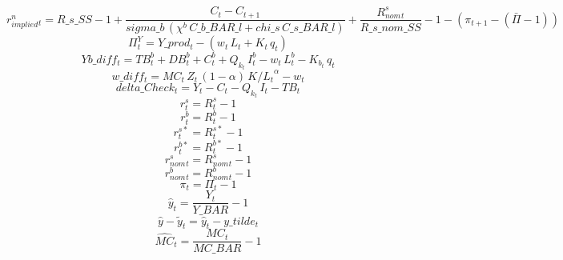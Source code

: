 \begin{dmath}
{r^n_{implied}_{t}}={R\_s\_SS}-1+\frac{{C_{t}}-{C_{t+1}}}{{sigma\_b}\, \left({\chi^b }\, {C\_b\_BAR\_l}+{chi\_s}\, {C\_s\_BAR\_l}\right)}+\frac{{ R^s_{nom}_{t}}}{{R\_s\_nom\_SS}}-1-\left({ \pi _{t+1}}-\left({ \bar{\Pi} }-1\right)\right)
\end{dmath}
\begin{dmath}
{\Pi^Y_{t}}={Y\_prod_{t}}-\left({w_{t}}\, {L_{t}}+{K_{t}}\, {q_{t}}\right)
\end{dmath}
\begin{dmath}
{Yb\_diff_{t}}={TB^b_{t}}+{DB^b_{t}}+{C^b_{t}}+{ Q_k _{t}}\, {I^b_{t}}-{w_{t}}\, {L^b_{t}}-{K_b_{t}}\, {q_{t}}
\end{dmath}
\begin{dmath}
{w\_diff_{t}}={MC_{t}}\, {Z_{t}}\, \left(1-{\alpha }\right)\, {K/L_{t}}^{{\alpha }}-{w_{t}}
\end{dmath}
\begin{dmath}
{delta\_Check_{t}}={Y_{t}}-{C_{t}}-{ Q_k _{t}}\, {I_{t}}-{TB_{t}}
\end{dmath}
\begin{dmath}
{r^s_{t}}={R^s_{t}}-1
\end{dmath}
\begin{dmath}
{r^b_{t}}={R^b_{t}}-1
\end{dmath}
\begin{dmath}
{r^{s*}_{t}}={R^{s*}_{t}}-1
\end{dmath}
\begin{dmath}
{r^{b*}_{t}}={R^{b*}_{t}}-1
\end{dmath}
\begin{dmath}
{ r^s_{nom}_{t}}={ R^s_{nom}_{t}}-1
\end{dmath}
\begin{dmath}
{ r^b_{nom}_{t}}={ R^b_{nom}_{t}}-1
\end{dmath}
\begin{dmath}
{ \pi _{t}}={ \Pi _{t}}-1
\end{dmath}
\begin{dmath}
{ \hat{y} _{t}}=\frac{{Y_{t}}}{{Y\_BAR}}-1
\end{dmath}
\begin{dmath}
{ \hat{y} - \tilde{y} _{t}}={ \hat{y} _{t}}-{y\_tilde_{t}}
\end{dmath}
\begin{dmath}
{ \hat{MC} _{t}}=\frac{{MC_{t}}}{{MC\_BAR}}-1
\end{dmath}
